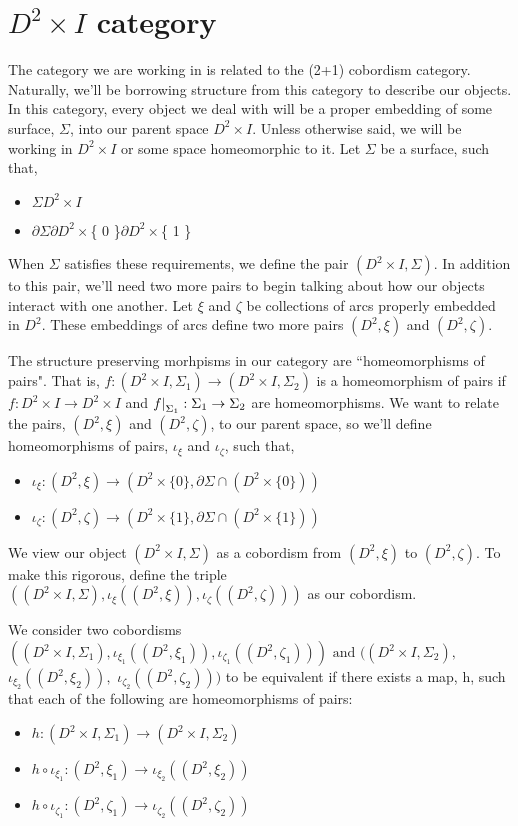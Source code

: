 \documentclass[11pt]{article}
\newcommand{\parent}{D^2\times I}
\newcommand\restr[2]{{%
  \left.\kern-\nulldelimiterspace %
  #1 %
  \littletaller %
  \right|_{#2} %
  }}
\newcommand{\littletaller}{\mathchoice{\vphantom{\big|}}{}{}{}}
\begin{document}
\section*{$\parent$ category}

The category we are working in is related to the (2+1) cobordism category. Naturally, we'll be borrowing structure from this category to describe our objects. In this category, every object we deal with will be a proper embedding of some surface, $\Sigma$, into our parent space $\parent$. Unless otherwise said, we will be working in $\parent$ or some space homeomorphic to it. Let $\Sigma$ be a surface, such that,
\begin{itemize}
\item $\Sigma$$\parent$
\item $\partial\Sigma$$\partial D^2\times$\{ 0 \}$\partial D^2\times$\{ 1 \}
\end{itemize}

When $\Sigma$ satisfies these requirements, we define the pair $(\parent,\Sigma)$. In addition to this pair, we'll need two more pairs to begin talking about how our objects interact with one another. Let $\xi$ and $\zeta$ be collections of arcs properly embedded in $D^2$. These embeddings of arcs define two more pairs $(D^2, \xi)$ and $(D^2, \zeta)$. 

The structure preserving morhpisms in our category are ``homeomorphisms of pairs". That is, $f: (\parent,\Sigma_1)\rightarrow(\parent,\Sigma_2)$ is a homeomorphism of pairs if $f:\parent\rightarrow\parent$ and $\restr{f}{\Sigma_1}:\Sigma_1\rightarrow\Sigma_2$ are homeomorphisms. We want to relate the pairs, $(D^2,\xi)$ and $(D^2,\zeta)$, to our parent space, so we'll define homeomorphisms of pairs, $\iota_\xi$ and $\iota_\zeta$, such that,
\begin{itemize}
\item $\iota_\xi:(D^2,\xi)\rightarrow(D^2\times\{ 0 \}, \partial\Sigma\cap(D^2\times\{ 0 \}))$
\item $\iota_\zeta:(D^2,\zeta)\rightarrow(D^2\times\{ 1 \}, \partial\Sigma\cap(D^2\times\{ 1 \}))$
\end{itemize}

We view our object $(\parent,\Sigma)$ as a cobordism from $(D^2,\xi)$ to $(D^2,\zeta)$. To make this rigorous, define the triple $((\parent,\Sigma),\iota_\xi((D^2,\xi)),\iota_\zeta((D^2,\zeta)))$ as our cobordism.

We consider two cobordisms $((\parent,\Sigma_1),\iota_{\xi_1}((D^2,\xi_1)),\iota_{\zeta_1}((D^2,\zeta_1)))\text{ and }((\parent,\Sigma_2),$ $ \iota_{\xi_2}((D^2,\xi_2)),$ $ \iota_{\zeta_2}((D^2,\zeta_2)))$ to be equivalent if there exists a map, h, such that each of the following are homeomorphisms of pairs:
\begin{itemize}
\item $h:(\parent,\Sigma_1)\rightarrow(\parent,\Sigma_2)$ 
\item $h\circ\iota_{\xi_1}: (D^2,\xi_1)\rightarrow\iota_{\xi_2}((D^2,\xi_2))$
\item $h\circ\iota_{\zeta_1}: (D^2,\zeta_1)\rightarrow\iota_{\zeta_2}((D^2,\zeta_2))$
\end{itemize}
\end{document}
